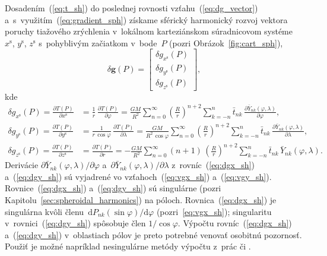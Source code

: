 \documentclass[a4paper,12pt]{book}
\newcommand{\diff}{\mathrm d}
\let\vec\mathbf
\begin{document}
Dosadením~(\ref{eq:t_sh}) do poslednej rovnosti vzťahu~(\ref{eq:dg_vector}) 
a~s~využitím~(\ref{eq:gradient_sph}) získame sférický harmonický rozvoj vektora 
poruchy tiažového zrýchlenia v~lokálnom karteziánskom súradnicovom 
systéme~$x^\mathrm{s}$, $y^\mathrm{s}$, $z^\mathrm{s}$ s~pohyblivým začiatkom 
v~bode~$P$ (pozri Obrázok~\ref{fig:cart_sph}),
%
\begin{equation}
\label{eq:dg_vec_sph}
\delta \vec g(P) =
%
\begin{bmatrix}
\delta g_{x^\mathrm{s}}(P)\\
\delta g_{y^\mathrm{s}}(P)\\
\delta g_{z^\mathrm{s}}(P)
\end{bmatrix}
%
{,}
\end{equation}
%
kde
%
\begin{align}
\label{eq:dgx_sh}
\delta g_{x^\mathrm{s}}(P) = \frac{\partial T(P)}{\partial x^\mathrm{s}} &= 
\frac{1}{r} \, \frac{\partial T(P)}{\partial \varphi} = \frac{GM}{R^2} \sum_{n 
= 0}^\infty \left( \frac{R}{r} \right)^{n + 2} \sum_{k = -n}^{n} \bar{t}_{nk} 
\, \frac{\partial \bar{Y}_{nk}(\varphi, \lambda)}{\partial \varphi}{,}\\
%
\label{eq:dgy_sh}
\delta g_{y^\mathrm{s}}(P) = \frac{\partial T(P)}{\partial y^\mathrm{s}} &= 
\frac{1}{r \, \cos\varphi} \, \frac{\partial T(P)}{\partial \lambda} 
= \frac{GM}{R^2 \, \cos\varphi} \sum_{n = 0}^\infty \left( \frac{R}{r} 
\right)^{n + 2} \sum_{k = -n}^{n}\bar{t}_{nk} \, \frac{\partial 
\bar{Y}_{nk}(\varphi, \lambda)}{\partial \lambda}{,}\\
%
\label{eq:dgz_sh}
\delta g_{z^\mathrm{s}}(P) = \frac{\partial T(P)}{\partial z^\mathrm{s}} &= 
\frac{\partial T(P)}{\partial r} = - \frac{GM}{R^2} \sum_{n = 0}^\infty (n + 1) 
\, \left( \frac{R}{r} \right)^{n + 2} \sum_{k = -n}^{n} \bar{t}_{nk} \, 
\bar{Y}_{nk}(\varphi, \lambda){.}
\end{align}
%
Derivácie $\partial \bar{Y}_{nk}(\varphi, \lambda) \slash \partial \varphi$ 
a~$\partial \bar{Y}_{nk}(\varphi, \lambda) \slash \partial \lambda$ 
z~rovníc~(\ref{eq:dgx_sh}) a~(\ref{eq:dgy_sh}) sú vyjadrené vo 
vzťahoch~(\ref{eq:vgx_sh}) a~(\ref{eq:vgy_sh}).  Rovnice~(\ref{eq:dgx_sh}) 
a~(\ref{eq:dgy_sh}) sú singulárne (pozri 
Kapitolu~\ref{sec:spheroidal_harmonics}) na póloch.  Rovnica~(\ref{eq:dgx_sh}) 
je singulárna kvôli členu~$\diff P_{nk}(\sin\varphi) \slash \diff \varphi$ 
(pozri~\ref{eq:vgx_sh}); singularitu v~rovnici~(\ref{eq:dgy_sh}) spôsobuje člen 
$1 \slash \cos\varphi$.  Výpočtu rovníc~(\ref{eq:dgx_sh}) a~(\ref{eq:dgy_sh}) 
v~oblastiach pólov je preto potrebné venovať osobitnú pozornosť.  Použiť je 
možné napríklad nesingulárne metódy výpočtu z~prác \textcite{Petrovskaya2012} 
či \textcite{Sebera2013} \parencite[pozri tiež][]{Ivanov2018}.
\end{document}
